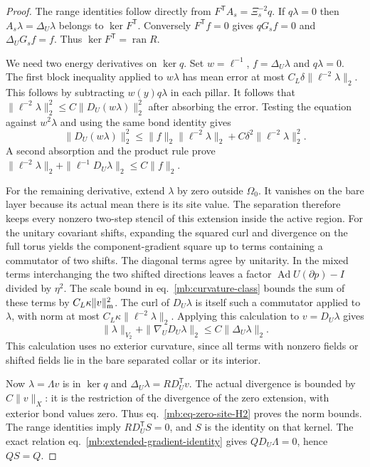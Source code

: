 \documentclass[11pt,letterpaper,reqno]{amsart}
\numberwithin{equation}{section}
\renewcommand{\eqref}[1]{\textup{eq.~\ref{#1}}}
\theoremstyle{definition}
\theoremstyle{remark}
\begin{document}
\begin{proof}
The range identities follow directly from
\(F^{\mathsf T}A_s=\Xi_s^{-2}q\). If \(q\lambda=0\) then
\(A_s\lambda=\Delta_U\lambda\) belongs to \(\ker F^{\mathsf T}\).
Conversely \(F^{\mathsf T}f=0\) gives \(qG_sf=0\) and
\(\Delta_U G_sf=f\). Thus \(\ker F^{\mathsf T}=\operatorname{ran}R\).

We need two energy derivatives on \(\ker q\). Set
\(w=\ell^{-1}\), \(f=\Delta_U\lambda\) and \(q\lambda=0\).
The first block inequality applied to \(w\lambda\) has mean
error at most \(C_L\delta\|\ell^{-2}\lambda\|_2\). This
follows by subtracting \(w(y)q\lambda\) in each pillar.
It follows that
\(\|\ell^{-2}\lambda\|_2^2\le C\|D_U(w\lambda)\|_2^2\)
after absorbing the error. Testing the equation against
\(w^2\lambda\) and using the same bond identity gives
\[
 \|D_U(w\lambda)\|_2^2
  \le\|f\|_2\|\ell^{-2}\lambda\|_2+
                   C\delta^2\|\ell^{-2}\lambda\|_2^2 .
\]
A second absorption and the product rule prove
\(\|\ell^{-2}\lambda\|_2+\|\ell^{-1}D_U\lambda\|_2
 \le C\|f\|_2\).

For the remaining derivative, extend \(\lambda\) by zero
outside \(\Omega_0\). It vanishes on the bare layer because
its actual mean there is its site value. The separation
therefore keeps every nonzero two-step stencil of this
extension inside the active region. For the unitary
covariant shifts, expanding the squared curl and divergence
on the full torus yields the component-gradient square
up to terms containing a commutator of two shifts.
The diagonal terms agree by unitarity. In the mixed terms
interchanging the two shifted directions leaves a factor
\(\operatorname{Ad} U(\partial p)-I\) divided by \(\eta^2\).
The scale bound in \eqref{mb:curvature-class} bounds the
sum of these terms by \(C_L\kappa\|v\|_{\rm m}^2\).
The curl of \(D_U\lambda\) is itself such a commutator
applied to \(\lambda\), with norm at most
\(C_L\kappa\|\ell^{-2}\lambda\|_2\).
Applying this calculation to \(v=D_U\lambda\) gives
\begin{equation}\label{mb:eq-zero-site-H2}
 \|\lambda\|_{V_2}+\|\nabla_U D_U\lambda\|_2
                         \le C\|\Delta_U\lambda\|_2 .
\end{equation}
This calculation uses no exterior curvature, since all
terms with nonzero fields or shifted fields lie in the
bare separated collar or its interior.

Now \(\lambda=\Lambda v\) is in \(\ker q\) and
\(\Delta_U\lambda=RD_U^{\mathsf T}v\). The actual divergence
is bounded by \(C\|v\|_X\): it is the restriction of the
divergence of the zero extension, with exterior bond
values zero. Thus \eqref{mb:eq-zero-site-H2} proves the
norm bounds. The range identities imply
\(RD_U^{\mathsf T}S=0\), and \(S\) is the identity on that
kernel. The exact relation \eqref{mb:extended-gradient-identity}
gives \(QD_U\Lambda=0\), hence \(QS=Q\).


\end{proof}
\end{document}
